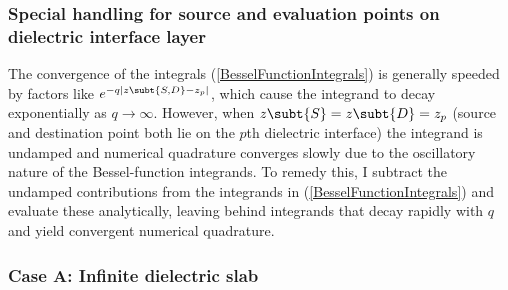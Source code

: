 \documentclass[letterpaper]{article}
\begin{document}
\subsubsection{Special handling for source and evaluation points 
               on dielectric interface layer}

The convergence of the integrals (\ref{BesselFunctionIntegrals})
is generally speeded by factors like $e^{-q|z\subt{S,D}-z_p|}$,
which cause the integrand to decay exponentially as $q\to\infty$.
However, when $z\subt{S}=z\subt{D}=z_p$ (source and destination
point both lie on the $p$th dielectric interface) the integrand is
undamped and numerical quadrature converges slowly due to
the oscillatory nature of the Bessel-function integrands.
To remedy this, I subtract the undamped contributions
from the integrands in (\ref{BesselFunctionIntegrals}) and
evaluate these analytically, leaving behind integrands that
decay rapidly with $q$ and yield convergent numerical quadrature.

\subsubsection*{Case A: Infinite dielectric slab}
\end{document}
